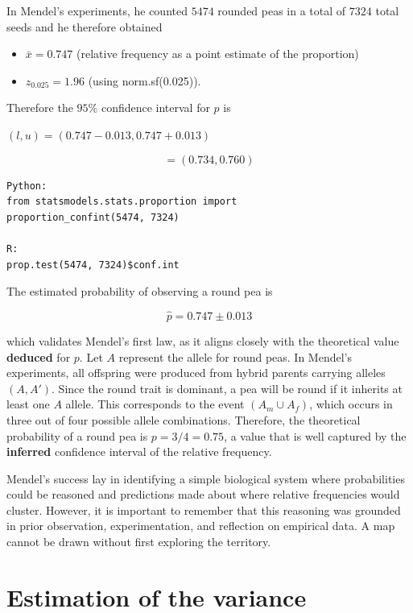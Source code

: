 \documentclass[
]{book}
\begin{document}
In Mendel's experiments, he counted \(5474\) rounded peas in a total of \(7324\) total seeds and he therefore obtained

\begin{itemize}
\item
  \(\bar{x}=0.747\) (relative frequency as a point estimate of the proportion)
\item
  \(z_{0.025}=1.96\) (using norm.sf(0.025)).
\end{itemize}

Therefore the \(95\%\) confidence interval for \(p\) is

\((l,u)=(0.747-0.013, 0.747+0.013)\)

\[=(0.734, 0.760)\]

\begin{verbatim}
Python:
from statsmodels.stats.proportion import
proportion_confint(5474, 7324)

R:
prop.test(5474, 7324)$conf.int
\end{verbatim}

The estimated probability of observing a round pea is

\[\hat{p} = 0.747 \pm 0.013\]

which validates Mendel's first law, as it aligns closely with the theoretical value \textbf{deduced} for \(p\). Let \(A\) represent the allele for round peas. In Mendel's experiments, all offspring were produced from hybrid parents carrying alleles \((A, A')\). Since the round trait is dominant, a pea will be round if it inherits at least one \(A\) allele. This corresponds to the event \((A_m \cup A_f)\), which occurs in three out of four possible allele combinations. Therefore, the theoretical probability of a round pea is \(p = 3/4 = 0.75\), a value that is well captured by the \textbf{inferred} confidence interval of the relative frequency.

Mendel's success lay in identifying a simple biological system where probabilities could be reasoned and predictions made about where relative frequencies would cluster. However, it is important to remember that this reasoning was grounded in prior observation, experimentation, and reflection on empirical data. A map cannot be drawn without first exploring the territory.

\hypertarget{estimation-of-the-variance}{%
\section{Estimation of the variance}\label{estimation-of-the-variance}}
\end{document}
